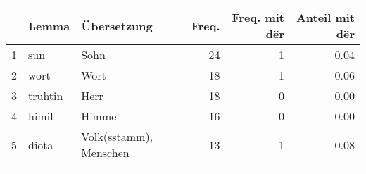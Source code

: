 \begin{tabular}{rllrrr}
  \lsptoprule
 & Lemma & Übersetzung & Freq. & Freq. mit dër & Anteil mit dër \\ 
  \midrule
1 & sun & Sohn &  24 &   1 & 0.04 \\ 
  2 & wort & Wort &  18 &   1 & 0.06 \\ 
  3 & truhtin & Herr &  18 &   0 & 0.00 \\ 
  4 & himil & Himmel &  16 &   0 & 0.00 \\ 
  5 & diota & Volk(sstamm), Menschen &  13 &   1 & 0.08 \\ 
   \lspbottomrule
\end{tabular}
